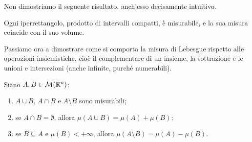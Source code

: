 Non dimostriamo il seguente risultato, anch'esso decisamente intuitivo.
\begin{proprieta} \label{pr:misura-iperrettangolo}
	Ogni iperrettangolo, prodotto di intervalli compatti, è misurabile, e la sua misura coincide con il suo volume.
\end{proprieta}
Passiamo ora a dimostrare come si comporta la misura di Lebesgue rispetto alle operazioni insiemistiche, cioè il complementare di un insieme, la sottrazione e le unioni e intersezioni (anche infinite, purch\'e numerabili).
\begin{proprieta} \label{pr:misura-unione-intersezione}
	Siano $A,B\in\mathcal M(\mathbb{R}^n)$:
	\begin{enumerate}
		\item $A\cup B$, $A\cap B$ e $A\setminus B$ sono misurabili;
		\item se $A\cap B=\emptyset$, allora $\mu(A\cup B)=\mu(A)+\mu(B)$;
		\item se $B\subseteq A$ e $\mu(B)<+\infty$, allora $\mu(A\setminus B)=\mu(A)-\mu(B)$.
	\end{enumerate}
\end{proprieta}

